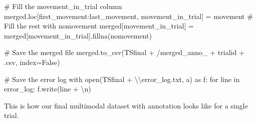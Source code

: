 \documentclass[
  letterpaper,
  DIV=11,
  numbers=noendperiod]{scrreprt}
\newenvironment{Shaded}{\begin{snugshade}}{\end{snugshade}}
\newcommand{\BuiltInTok}[1]{\textcolor[rgb]{0.00,0.23,0.31}{#1}}
\newcommand{\CharTok}[1]{\textcolor[rgb]{0.13,0.47,0.30}{#1}}
\newcommand{\CommentTok}[1]{\textcolor[rgb]{0.37,0.37,0.37}{#1}}
\newcommand{\ControlFlowTok}[1]{\textcolor[rgb]{0.00,0.23,0.31}{#1}}
\newcommand{\ImportTok}[1]{\textcolor[rgb]{0.00,0.46,0.62}{#1}}
\newcommand{\KeywordTok}[1]{\textcolor[rgb]{0.00,0.23,0.31}{#1}}
\newcommand{\NormalTok}[1]{\textcolor[rgb]{0.00,0.23,0.31}{#1}}
\newcommand{\OperatorTok}[1]{\textcolor[rgb]{0.37,0.37,0.37}{#1}}
\newcommand{\StringTok}[1]{\textcolor[rgb]{0.13,0.47,0.30}{#1}}
\newcommand{\VariableTok}[1]{\textcolor[rgb]{0.07,0.07,0.07}{#1}}
\begin{document}
\begin{Shaded}
\begin{Highlighting}[]
    \CommentTok{\# Fill the movement\_in\_trial column}
\NormalTok{    merged.loc[first\_movement:last\_movement, }\StringTok{\textquotesingle{}movement\_in\_trial\textquotesingle{}}\NormalTok{] }\OperatorTok{=} \StringTok{\textquotesingle{}movement\textquotesingle{}}
    \CommentTok{\# Fill the rest with \textquotesingle{}nomovement\textquotesingle{}}
\NormalTok{    merged[}\StringTok{\textquotesingle{}movement\_in\_trial\textquotesingle{}}\NormalTok{] }\OperatorTok{=}\NormalTok{ merged[}\StringTok{\textquotesingle{}movement\_in\_trial\textquotesingle{}}\NormalTok{].fillna(}\StringTok{\textquotesingle{}nomovement\textquotesingle{}}\NormalTok{)}

    \CommentTok{\# Save the merged file}
\NormalTok{    merged.to\_csv(TSfinal }\OperatorTok{+} \StringTok{\textquotesingle{}/merged\_anno\_\textquotesingle{}} \OperatorTok{+}\NormalTok{ trialid }\OperatorTok{+} \StringTok{\textquotesingle{}.csv\textquotesingle{}}\NormalTok{, index}\OperatorTok{=}\VariableTok{False}\NormalTok{)}

    \CommentTok{\# Save the error log}
    \ControlFlowTok{with} \BuiltInTok{open}\NormalTok{(TSfinal }\OperatorTok{+} \StringTok{\textquotesingle{}}\CharTok{\textbackslash{}\textbackslash{}}\StringTok{error\_log.txt\textquotesingle{}}\NormalTok{, }\StringTok{\textquotesingle{}a\textquotesingle{}}\NormalTok{) }\ImportTok{as}\NormalTok{ f:}
        \ControlFlowTok{for}\NormalTok{ line }\KeywordTok{in}\NormalTok{ error\_log:}
\NormalTok{            f.write(line }\OperatorTok{+} \StringTok{\textquotesingle{}}\CharTok{\textbackslash{}n}\StringTok{\textquotesingle{}}\NormalTok{)}
\end{Highlighting}
\end{Shaded}

This is how our final multimodal dataset with annotation looks like for
a single trial.
\end{document}
